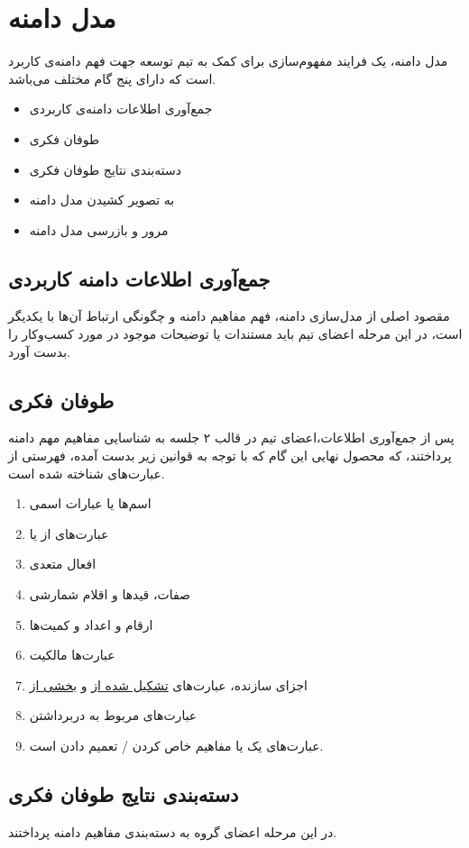 \chapter{مدل دامنه}
مدل دامنه، یک فرایند مفهوم‌سازی برای کمک به تیم توسعه جهت فهم دامنه‌ی کاربرد است که دارای پنج گام مختلف می‌باشد.
\begin{itemize}
	\item
	جمع‌آوری اطلاعات دامنه‌‌ی کاربردی
	\item
	طوفان فکری
	\item
	دسته‌بندی نتایج طوفان فکری
	\item
	به تصویر کشیدن مدل دامنه
	\item
	مرور و بازرسی مدل دامنه
\end{itemize}

\section{جمع‌آوری اطلاعات دامنه کاربردی}
مقصود اصلی از مدل‌سازی دامنه، فهم مفاهیم دامنه و چگونگی ارتباط آن‌ها با یکدیگر است، در این مرحله اعضای تیم باید مستندات یا توضیحات موجود در مورد کسب‌و‌کار را بدست آورد.
\section{طوفان فکری}
پس از جمع‌آوری اطلاعات،‌اعضای تیم در قالب ۲ جلسه به شناسایی مفاهیم مهم دامنه پرداختند، که محصول نهایی این گام که با توجه به قوانین زیر بدست آمده، فهرستی از عبارت‌های شناخته شده است.
\begin{enumerate}
	\item
	اسم‌‌ها یا عبارات اسمی
	\item
	عبارت‌های
	 از 
	یا
	\item
	افعال متعدی
	\item
	صفات، قید‌‌ها و اقلام شمارشی
	\item
	ارقام و اعداد و کمیت‌ها
	\item
	عبارت‌ها مالکیت
	\item
	اجزای سازنده، عبارت‌های
	\underline{تشکیل شده از} و
	\underline{بخشی از}
	\item
	عبارت‌های مربوط به دربرداشتن
	\item
	عبارت‌های
	یک
	یا مفاهیم خاص کردن / تعمیم دادن است.
\end{enumerate}

\section{دسته‌بندی نتایج طوفان فکری}
در این مرحله اعضای گروه به دسته‌بندی مفاهیم دامنه پرداختند.

